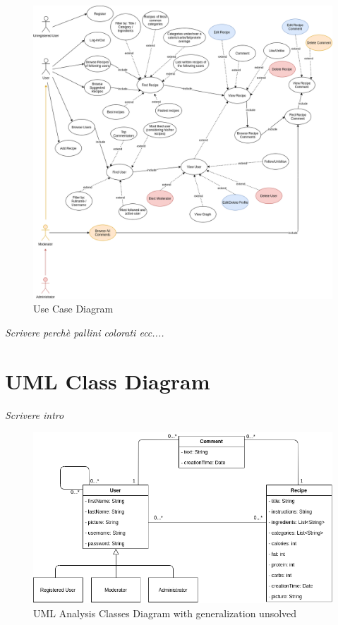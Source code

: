 \documentclass[a4paper]{report}
\begin{document}
\begin{figure}[htpb]
	\centering
	\includegraphics[scale=0.42]{img/UseCaseDiagram.png}
	\caption{Use Case Diagram}
\end{figure}
\emph{Scrivere perchè pallini colorati ecc....}


\section{UML Class Diagram}
\emph{Scrivere intro}
\begin{figure}[htpb]
	\centering
	\includegraphics[scale=0.58]{img/ClassDiagram_generaliz.png}
	\caption{UML Analysis Classes Diagram with generalization unsolved}
\end{figure}
\end{document}
